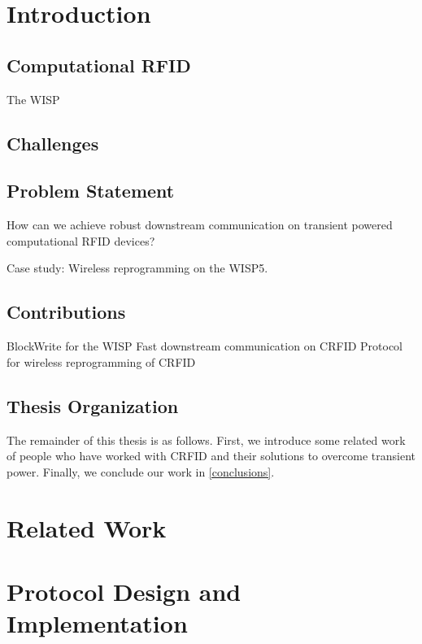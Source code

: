 \documentclass[11pt,twoside,a4paper,openright]{report}
\begin{document}
\tableofcontents

\cleardoublepage

\setcounter{page}{1}

\chapter{Introduction}
\label{intro}

\section{Computational RFID}
The WISP \cite{4539485}

\section{Challenges}

\section{Problem Statement}
How can we achieve robust downstream communication on transient powered computational RFID devices?

Case study: Wireless reprogramming on the WISP5.

\section{Contributions}
BlockWrite for the WISP
Fast downstream communication on CRFID
Protocol for wireless reprogramming of CRFID

\section{Thesis Organization}
The remainder of this thesis is as follows.
First, we introduce some related work of people who have worked with CRFID and their solutions to overcome transient power.
Finally, we conclude our work in \cref{conclusions}.

\chapter{Related Work}
\label{relatedwork}


\chapter{Protocol Design and Implementation}
\label{design}
\end{document}
